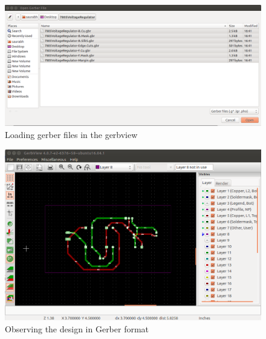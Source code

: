 \begin{figure}
\centering
\includegraphics[height=0.4\textwidth]{gerbviewloading.png}
\caption{Loading gerber files in the gerbview}
\label{gerbviewloading}
\end{figure}

\begin{figure}
\centering
\includegraphics[height=0.4\textwidth]{gerbviewcapture.png}
\caption{Observing the design in Gerber format}
\label{gerbviewcapture}
\end{figure}